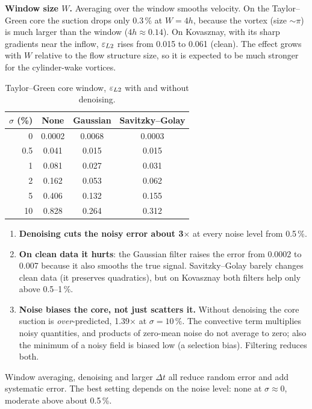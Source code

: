 \textbf{Window size $W$.} Averaging over the window smooths velocity. On the Taylor--Green core the suction drops only 0.3\,\% at $W=4h$, because the vortex (size $\sim\pi$) is much larger than the window ($4h\approx0.14$). On Kovasznay, with its sharp gradients near the inflow, $\varepsilon_{L2}$ rises from 0.015 to 0.061 (clean). The effect grows with $W$ relative to the flow structure size, so it is expected to be much stronger for the cylinder-wake vortices.

\begin{table}[H]\centering\small
\begin{tabular}{@{}rccc@{}}\toprule
$\sigma$ (\%) & None & Gaussian & Savitzky--Golay\\\midrule
0 & 0.0002 & 0.0068 & 0.0003\\
0.5 & 0.041 & 0.015 & 0.015\\
1 & 0.081 & 0.027 & 0.031\\
2 & 0.162 & 0.053 & 0.062\\
5 & 0.406 & 0.132 & 0.155\\
10 & 0.828 & 0.264 & 0.312\\\bottomrule
\end{tabular}
\caption{Taylor--Green core window, $\varepsilon_{L2}$ with and without denoising.}\end{table}

\begin{enumerate}
\item \textbf{Denoising cuts the noisy error about 3$\times$} at every noise level from 0.5\,\%.
\item \textbf{On clean data it hurts}: the Gaussian filter raises the error from 0.0002 to 0.007 because it also smooths the true signal. Savitzky--Golay barely changes clean data (it preserves quadratics), but on Kovasznay both filters help only above 0.5--1\,\%.
\item \textbf{Noise biases the core, not just scatters it.} Without denoising the core suction is \emph{over}-predicted, 1.39$\times$ at $\sigma=10\,\%$. The convective term multiplies noisy quantities, and products of zero-mean noise do not average to zero; also the minimum of a noisy field is biased low (a selection bias). Filtering reduces both.
\end{enumerate}

\begin{keyidea}
Window averaging, denoising and larger $\Delta t$ all reduce random error and add systematic error. The best setting depends on the noise level: none at $\sigma\approx0$, moderate above about 0.5\,\%.
\end{keyidea}


